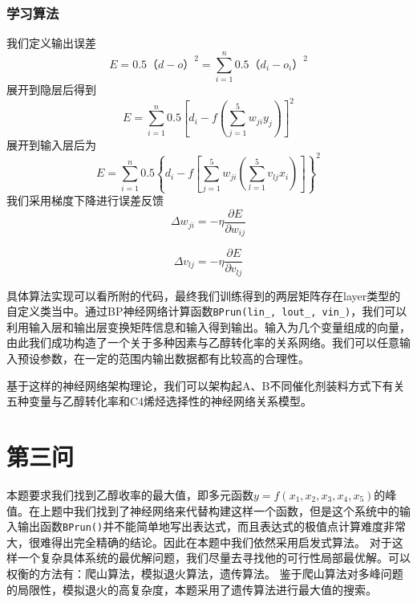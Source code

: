\documentclass{article}
\begin{document}
	\subsubsection{学习算法}
	我们定义输出误差
	\begin{equation}
		E=0.5（d-o）^2=\sum_{i=1}^n 0.5（d_i-o_i）^2
	\end{equation}
	展开到隐层后得到
	\begin{equation}
		E=\sum_{i=1}^n0.5\left[d_i-f\left(\sum_{j=1}^5w_{ji}y_j\right)\right]^2
	\end{equation}
	展开到输入层后为
	\begin{equation}
		E=\sum_{i=1}^n0.5\left\{d_i-f\left[\sum_{j=1}^5w_{ji}\left(\sum_{l=1}^5v_{lj}x_i\right)\right]\right\}^2
	\end{equation}
	我们采用梯度下降进行误差反馈
	\begin{equation}
		\Delta w_{ji}=-\eta\frac{\partial E}{\partial w_{ij}}
	\end{equation}

	\begin{equation}
		\Delta v_{lj}=-\eta\frac{\partial E}{\partial v_{lj}}
	\end{equation}
	
	具体算法实现可以看所附的代码，最终我们训练得到的两层矩阵存在layer类型的自定义类当中。通过BP神经网络计算函数\verb|BPrun(lin_, lout_, vin_)|，我们可以利用输入层和输出层变换矩阵信息和输入得到输出。输入为几个变量组成的向量，由此我们成功构造了一个关于多种因素与乙醇转化率的关系网络。我们可以任意输入预设参数，在一定的范围内输出数据都有比较高的合理性。
	
	基于这样的神经网络架构理论，我们可以架构起A、B不同催化剂装料方式下有关五种变量与乙醇转化率和C4烯烃选择性的神经网络关系模型。
	
	\section{第三问}
	本题要求我们找到乙醇收率的最大值，即多元函数$y=f(x_1,x_2,x_3,x_4,x_5)$的峰值。在上题中我们找到了神经网络来代替构建这样一个函数，但是这个系统中的输入输出函数\verb|BPrun()|并不能简单地写出表达式，而且表达式的极值点计算难度非常大，很难得出完全精确的结论。因此在本题中我们依然采用启发式算法。
	对于这样一个复杂具体系统的最优解问题，我们尽量去寻找他的可行性局部最优解。可以权衡的方法有：爬山算法，模拟退火算法，遗传算法。
	鉴于爬山算法对多峰问题的局限性，模拟退火的高复杂度，本题采用了遗传算法进行最大值的搜索。
\end{document}
